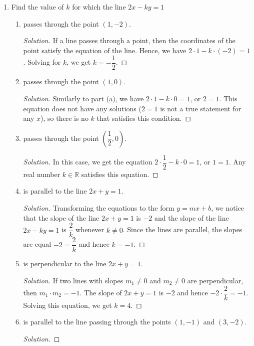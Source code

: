 \documentclass[12pt]{article}
\newenvironment{solution}{\begin{proof}[Solution]}{\end{proof}}
\begin{document}
\begin{enumerate}
		\begin{solution}
			The line is parallel to $l_1$, so it has the same slope $m=\dfrac{-1-1}{3-2}=-2$, and passes through the point $(2,0)$. Hence, its equation is $y-0=-2(x-2)$, or $2x+y-4=0$.
		\end{solution}
		\item Find the value of $k$ for which the line $2x-ky=1$
		\begin{enumerate}
			\item passes through the point $(1,-2)$.
			\begin{solution}
				If a line passes through a point, then the coordinates of the point satisfy the equation of the line. Hence, we have $2\cdot1-k\cdot(-2)=1$. Solving for $k$, we get $k=-\dfrac{1}{2}$.
			\end{solution}
			\item passes through the point $(1,0)$.
			\begin{solution}
				Similarly to part (a), we have $2\cdot 1-k\cdot 0=1$, or $2=1$. This equation does not have any solutions ($2=1$ is not a true statement for any $x$), so there is no $k$ that satisfies this condition.
			\end{solution}
			\item passes through the point $(\dfrac{1}{2},0)$.
			\begin{solution}
				In this case, we get the equation $2\cdot\dfrac{1}{2}-k\cdot0=1$, or $1=1$. Any real number $k \in \mathbb{R}$ satisfies this equation.
			\end{solution}
			\item is parallel to the line $2x+y=1$.
			\begin{solution}
				Transforming the equations to the form $y=mx+b$, we notice that the slope of the line $2x+y=1$ is $-2$ and the slope of the line $2x-ky=1$ is $\dfrac{2}{k}$ whenever $k\neq0$. Since the lines are parallel, the slopes are equal $-2=\dfrac{2}{k}$ and hence $k=-1$.
			\end{solution}
			\item is perpendicular to the line $2x+y=1$.
			\begin{solution}
				If two lines with slopes $m_1\neq 0$ and $m_2\neq 0$ are perpendicular, then $m_1\cdot m_2=-1$. The slope of $2x+y=1$ is $-2$ and hence $-2\cdot\dfrac{2}{k}=-1$. Solving this equation, we get $k=4$.
			\end{solution}
			\item is parallel to the line passing through the points $(1,-1)$ and $(3,-2)$.
			\begin{solution}

\end{solution}
\end{enumerate}
\end{enumerate}
\end{document}
